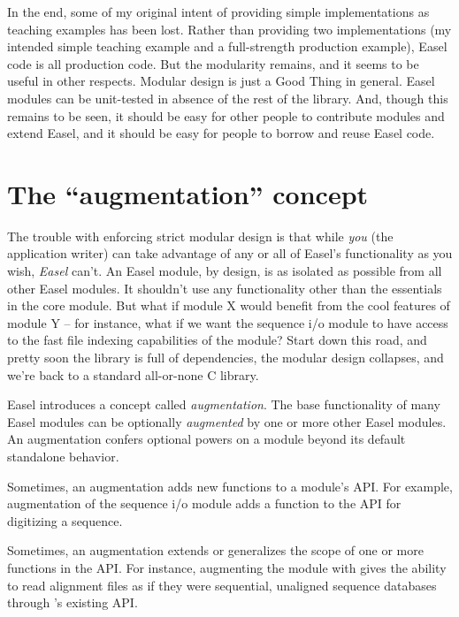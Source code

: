 In the end, some of my original intent of providing simple
implementations as teaching examples has been lost. Rather than
providing two implementations (my intended simple teaching example and
a full-strength production example), Easel code is all production
code. But the modularity remains, and it seems to be useful in other
respects.  Modular design is just a Good Thing in general.  Easel
modules can be unit-tested in absence of the rest of the library.
And, though this remains to be seen, it should be easy for other
people to contribute modules and extend Easel, and it should be easy
for people to borrow and reuse Easel code.

\section{The ``augmentation'' concept}

The trouble with enforcing strict modular design is that while
\emph{you} (the application writer) can take advantage of any or all
of Easel's functionality as you wish, \emph{Easel} can't. An Easel
module, by design, is as isolated as possible from all other Easel
modules. It shouldn't use any functionality other than the essentials
in the core  module. But what if module X would benefit
from the cool features of module Y -- for instance, what if we want
the  sequence i/o module to have access to the fast file
indexing capabilities of the  module?  Start down this
road, and pretty soon the library is full of dependencies, the modular
design collapses, and we're back to a standard all-or-none C library.

Easel introduces a concept called \emph{augmentation}. The base
functionality of many Easel modules can be optionally \emph{augmented}
by one or more other Easel modules. An augmentation confers optional
powers on a module beyond its default standalone behavior.

Sometimes, an augmentation adds new functions to a module's API.  For
example,  augmentation of the sequence i/o module
 adds a function to the  API for digitizing
a sequence.

Sometimes, an augmentation extends or generalizes the scope of one or
more functions in the API. For instance, augmenting the 
module with  gives the ability to read alignment files as
if they were sequential, unaligned sequence databases through
's existing API.

